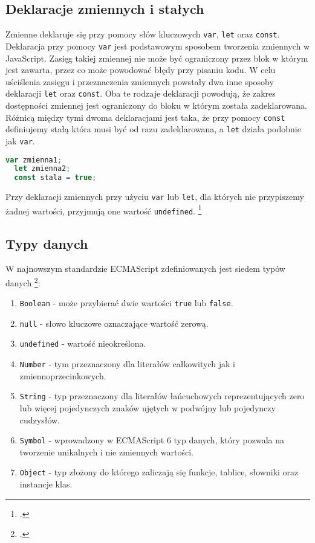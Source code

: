 \subsection{Deklaracje zmiennych i stałych}
\par Zmienne deklaruje się przy pomocy słów kluczowych \texttt{var}, \texttt{let} oraz \texttt{const}. Deklaracja przy pomocy \texttt{var} jest podstawowym sposobem tworzenia zmiennych w JavaScript. Zasięg takiej zmiennej nie może być ograniczony przez blok w którym jest zawarta, przez co może powodować błędy przy pisaniu kodu. W celu uściślenia zasięgu i przeznaczenia zmiennych powstały dwa inne sposoby deklaracji \texttt{let} oraz \texttt{const}. Oba te rodzaje deklaracji powodują, że zakres dostępności zmiennej jest ograniczony do bloku w którym została zadeklarowana. Różnicą między tymi dwoma deklaracjami jest taka, że przy pomocy \texttt{const} definiujemy stałą która musi być od razu zadeklarowana, a \texttt{let} działa podobnie jak \texttt{var}.
\begin{lstlisting}[language=JavaScript, caption=Przykład deklaracji zmiennych, label=alg:deklaracjaZmiennej1]
  var zmienna1;
  let zmienna2;
  const stala = true;
\end{lstlisting}
\par Przy deklaracji zmiennych przy użyciu \texttt{var} lub \texttt{let}, dla których nie przypiszemy żadnej wartości, przyjmują one wartość \texttt{undefined}. \footcite{jsGrammar_and_types}

\subsection{Typy danych}
\par W najnowszym standardzie ECMAScript zdefiniowanych jest siedem typów danych \footcite{jsGrammar_and_types}:
\begin{enumerate}
  \item \texttt{Boolean} - może przybierać dwie wartości \texttt{true} lub \texttt{false}.
  \item \texttt{null} - słowo kluczowe oznaczające wartość zerową. 
  \item \texttt{undefined} - wartość nieokreślona.
  \item \texttt{Number} - tym przeznaczony dla literałów całkowitych jak i zmiennoprzecinkowych.
  \item \texttt{String} - typ przeznaczony dla literałów łańcuchowych reprezentujących zero lub więcej pojedynczych znaków ujętych w podwójny lub pojedynczy cudzysłów.
  \item \texttt{Symbol} - wprowadzony w ECMAScript 6 typ danych, który pozwala na tworzenie unikalnych i nie zmiennych wartości.
  \item \texttt{Object} - typ złożony do którego zaliczają się funkcje, tablice, słowniki oraz instancje klas.
\end{enumerate}

